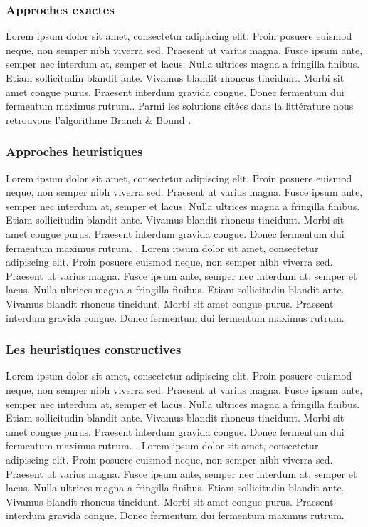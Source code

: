 \medskip

\subsubsection{Approches exactes}
Lorem ipsum dolor sit amet, consectetur adipiscing elit. Proin posuere euismod neque, non semper nibh viverra sed. Praesent ut varius magna. Fusce ipsum ante, semper nec interdum at, semper et lacus. Nulla ultrices magna a fringilla finibus. Etiam sollicitudin blandit ante. Vivamus blandit rhoncus tincidunt. Morbi sit amet congue purus. Praesent interdum gravida congue. Donec fermentum dui fermentum maximus rutrum.. Parmi les solutions citées dans la littérature nous retrouvons l'algorithme Branch \& Bound \parencite{diderich_solving_1996,cotta_hybridizing_1995, tschoke_solving_1995}.

\medskip

\subsubsection{Approches heuristiques}
Lorem ipsum dolor sit amet, consectetur adipiscing elit. Proin posuere euismod neque, non semper nibh viverra sed. Praesent ut varius magna. Fusce ipsum ante, semper nec interdum at, semper et lacus. Nulla ultrices magna a fringilla finibus. Etiam sollicitudin blandit ante. Vivamus blandit rhoncus tincidunt. Morbi sit amet congue purus. Praesent interdum gravida congue. Donec fermentum dui fermentum maximus rutrum. \parencite{anbuudayasankar_survey_2014}.
Lorem ipsum dolor sit amet, consectetur adipiscing elit. Proin posuere euismod neque, non semper nibh viverra sed. Praesent ut varius magna. Fusce ipsum ante, semper nec interdum at, semper et lacus. Nulla ultrices magna a fringilla finibus. Etiam sollicitudin blandit ante. Vivamus blandit rhoncus tincidunt. Morbi sit amet congue purus. Praesent interdum gravida congue. Donec fermentum dui fermentum maximus rutrum.


\medskip

\subsubsection{Les heuristiques constructives}
Lorem ipsum dolor sit amet, consectetur adipiscing elit. Proin posuere euismod neque, non semper nibh viverra sed. Praesent ut varius magna. Fusce ipsum ante, semper nec interdum at, semper et lacus. Nulla ultrices magna a fringilla finibus. Etiam sollicitudin blandit ante. Vivamus blandit rhoncus tincidunt. Morbi sit amet congue purus. Praesent interdum gravida congue. Donec fermentum dui fermentum maximus rutrum. \parencite{anbuudayasankar_survey_2014}. Lorem ipsum dolor sit amet, consectetur adipiscing elit. Proin posuere euismod neque, non semper nibh viverra sed. Praesent ut varius magna. Fusce ipsum ante, semper nec interdum at, semper et lacus. Nulla ultrices magna a fringilla finibus. Etiam sollicitudin blandit ante. Vivamus blandit rhoncus tincidunt. Morbi sit amet congue purus. Praesent interdum gravida congue. Donec fermentum dui fermentum maximus rutrum.
\medskip

